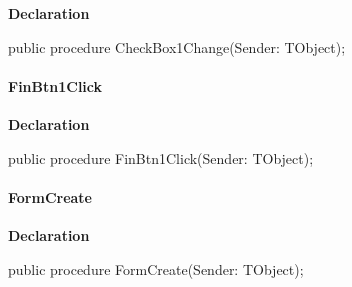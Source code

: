 \documentclass{report}
\newif\ifpdf
\begin{document}
\label{mainunit.TIWizFrm-CheckBox1Change}
\begin{list}{}{
\setlength{\itemindent}{0cm}
\setlength{\listparindent}{0cm}
\setlength{\leftmargin}{\evensidemargin}
\addtolength{\leftmargin}{\tmplength}
\settowidth{\labelsep}{X}
\addtolength{\leftmargin}{\labelsep}
\setlength{\labelwidth}{\tmplength}
}
\item[\textbf{Declaration}\hfill]
\ifpdf
\begin{flushleft}
\fi
\begin{ttfamily}
public procedure CheckBox1Change(Sender: TObject);\end{ttfamily}

\ifpdf
\end{flushleft}
\fi

\end{list}
\paragraph*{FinBtn1Click}\hspace*{\fill}

\label{mainunit.TIWizFrm-FinBtn1Click}
\begin{list}{}{
\setlength{\itemindent}{0cm}
\setlength{\listparindent}{0cm}
\setlength{\leftmargin}{\evensidemargin}
\addtolength{\leftmargin}{\tmplength}
\settowidth{\labelsep}{X}
\addtolength{\leftmargin}{\labelsep}
\setlength{\labelwidth}{\tmplength}
}
\item[\textbf{Declaration}\hfill]
\ifpdf
\begin{flushleft}
\fi
\begin{ttfamily}
public procedure FinBtn1Click(Sender: TObject);\end{ttfamily}

\ifpdf
\end{flushleft}
\fi

\end{list}
\paragraph*{FormCreate}\hspace*{\fill}

\label{mainunit.TIWizFrm-FormCreate}
\begin{list}{}{
\setlength{\itemindent}{0cm}
\setlength{\listparindent}{0cm}
\setlength{\leftmargin}{\evensidemargin}
\addtolength{\leftmargin}{\tmplength}
\settowidth{\labelsep}{X}
\addtolength{\leftmargin}{\labelsep}
\setlength{\labelwidth}{\tmplength}
}
\item[\textbf{Declaration}\hfill]
\ifpdf
\begin{flushleft}
\fi
\begin{ttfamily}
public procedure FormCreate(Sender: TObject);\end{ttfamily}

\ifpdf
\end{flushleft}
\fi

\end{list}
\end{document}
